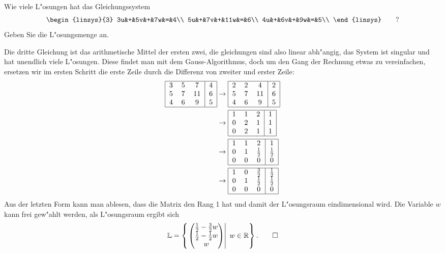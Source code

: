Wie viele L"osungen hat das Gleichungssystem
\[
\begin{linsys}{3}
3u&+&5v&+&7w&=&4\\
5u&+&7v&+&11w&=&6\\
4u&+&6v&+&9w&=&5\\
\end{linsys}
\qquad
?
\]
Geben Sie die L"osungsmenge an.

\begin{loesung}
Die dritte Gleichung ist das arithmetische Mittel der ersten zwei,
die gleichungen sind also linear abh"angig, das System ist singular
und hat unendlich viele L"osungen. Diese findet man mit dem
Gauss-Algorithmus, doch um den Gang der Rechnung etwas zu vereinfachen,
ersetzen wir im ersten Schritt die erste Zeile durch die Differenz von
zweiter und erster Zeile:
\begin{align*}
\begin{tabular}{|ccc|c|}
\hline
3&5&7&4\\
5&7&11&6\\
4&6&9&5\\
\hline
\end{tabular}
&\rightarrow
\begin{tabular}{|ccc|c|}
\hline
2&2&4&2\\
5&7&11&6\\
4&6&9&5\\
\hline
\end{tabular}
\\
&\rightarrow
\begin{tabular}{|ccc|c|}
\hline
1&1&2&1\\
0&2&1&1\\
0&2&1&1\\
\hline
\end{tabular}
\\
&\rightarrow
\begin{tabular}{|ccc|c|}
\hline
1&1&2&1\\
0&1&$\frac12$&$\frac12$\\
0&0&0&0\\
\hline
\end{tabular}
\\
&\rightarrow
\begin{tabular}{|ccc|c|}
\hline
1&0&$\frac32$&$\frac12$\\
0&1&$\frac12$&$\frac12$\\
0&0&0&0\\
\hline
\end{tabular}
\end{align*}
Aus der letzten Form kann man ablesen, dass die Matrix den
Rang 1 hat und damit der L"osungsraum eindimensional wird.
Die Variable $w$ kann frei gew"ahlt werden, als L"osungsraum
ergibt sich
\[
{\mathbb L}=\left\{\left.\begin{pmatrix}\frac12-\frac32w\\\frac12-\frac12w\\w\end{pmatrix}\right|\;w\in\mathbb R\right\}.
\qedhere
\]
\end{loesung}

